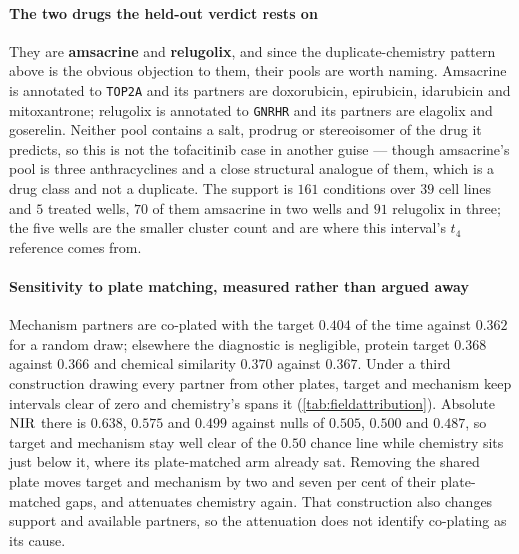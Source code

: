 \paragraph{The two drugs the held-out verdict rests on} They are
\textbf{amsacrine} and \textbf{relugolix}, and since the duplicate-chemistry
pattern above is the obvious objection to them, their pools are worth naming.
Amsacrine is annotated to \texttt{TOP2A} and its partners are doxorubicin,
epirubicin, idarubicin and mitoxantrone; relugolix is annotated to \texttt{GNRHR}
and its partners are elagolix and goserelin. Neither pool contains a salt,
prodrug or stereoisomer of the drug it predicts, so this is not the tofacitinib
case in another guise --- though amsacrine's pool is three anthracyclines and a
close structural analogue of them, which is a drug class and not a duplicate. The
support is $\num{161}$ conditions over $39$ cell lines and $5$ treated wells, $70$
of them amsacrine in two wells and $91$ relugolix in three; the five wells are the
smaller cluster count and are where this interval's $t_4$ reference comes
from.

\paragraph{Sensitivity to plate matching, measured rather than argued away}
Mechanism partners are co-plated with the target $0.404$ of the time against
$0.362$ for a random draw; elsewhere the diagnostic is negligible, protein target
$0.368$ against $0.366$ and chemical similarity $0.370$ against $0.367$. Under a
third construction drawing every partner from other plates, target and mechanism
keep intervals clear of zero and chemistry's spans it
(\cref{tab:fieldattribution}). Absolute $\textrm{NIR}$ there is $0.638$, $0.575$ and
$0.499$ against nulls of $0.505$, $0.500$ and $0.487$, so target and mechanism
stay well clear of the $0.50$ chance line while chemistry sits just below it,
where its plate-matched arm already sat. Removing the shared plate moves target
and mechanism by two and seven per cent of their plate-matched gaps, and
attenuates chemistry again. That
construction also changes support and available partners, so the attenuation does
not identify co-plating as its cause.

